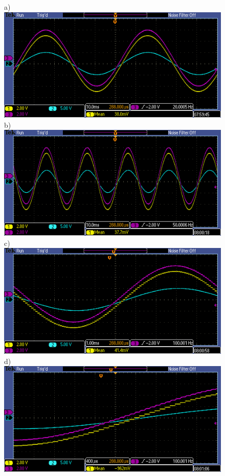 \documentclass{article}
\begin{document}
    \begin{figure}[H]
        \centering
        a)\includegraphics[scale = 0.4]{7a.PNG}
        b)\includegraphics[scale = 0.4]{7b.PNG}
        c)\includegraphics[scale = 0.4]{7c.PNG}
        d)\includegraphics[scale = 0.4]{7d.PNG}

\end{figure}
\end{document}
